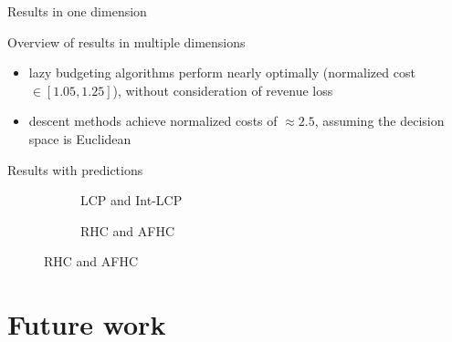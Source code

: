 \documentclass{beamer}
\begin{document}
\begin{frame}{Results in one dimension}
\begin{figure}
    \begin{subfigure}[b]{.38\linewidth}
    \resizebox{\textwidth}{!}{}
    \end{subfigure}\pause
    \begin{subfigure}[b]{.38\linewidth}
    \resizebox{\textwidth}{!}{}
    \end{subfigure}\pause
    \par\bigskip
    \begin{subfigure}[b]{.38\linewidth}
    \resizebox{\textwidth}{!}{}
    \end{subfigure}
\end{figure}
\end{frame}

\begin{frame}{Overview of results in multiple dimensions}
\begin{itemize}
    \item lazy budgeting algorithms perform nearly optimally (normalized cost $\in [1.05, 1.25]$), without consideration of revenue loss\pause
    \item descent methods achieve normalized costs of $\approx 2.5$, assuming the decision space is Euclidean
\end{itemize}
\end{frame}

\begin{frame}{Results with predictions}
\begin{figure}
    \begin{subfigure}[b]{.51\linewidth}
    \resizebox{\textwidth}{!}{}
    \caption{LCP and Int-LCP}
    \end{subfigure}\pause
    \begin{subfigure}[b]{.48\linewidth}
    \resizebox{\textwidth}{!}{}
    \caption{RHC and AFHC}
    \end{subfigure}
\end{figure}
\end{frame}

\section{Future work}
\end{document}
